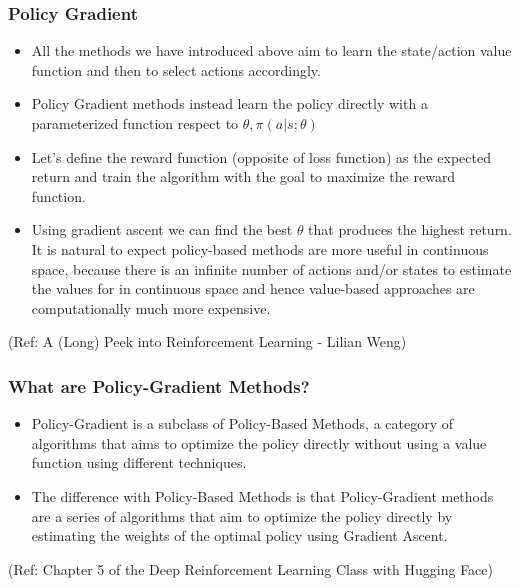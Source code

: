 \begin{frame}[fragile]\frametitle{Policy Gradient}

\begin{itemize}
\item All the methods we have introduced above aim to learn the state/action value function and then to
select actions accordingly. 
\item Policy Gradient methods instead learn the policy directly with a parameterized function respect to $\theta,\pi(a|s;\theta)$
\item Let's define the reward function (opposite of loss
function) as the expected return and train the algorithm with the goal to maximize the reward function.
\item Using gradient ascent we can find the best $\theta$ that produces the highest return. It is natural to expect
policy-based methods are more useful in continuous space, because there is an infinite number of
actions and/or states to estimate the values for in continuous space and hence value-based
approaches are computationally much more expensive.
\end{itemize}

{\tiny (Ref: A (Long) Peek into Reinforcement Learning - Lilian Weng)}


\end{frame}

\begin{frame}[fragile]\frametitle{What are Policy-Gradient Methods?}

\begin{itemize}
\item Policy-Gradient is a subclass of Policy-Based Methods, a category of algorithms that aims to optimize the policy directly without using a value function using different techniques. 
\item The difference with Policy-Based Methods is that Policy-Gradient methods are a series of algorithms that aim to optimize the policy directly by estimating the weights of the optimal policy using Gradient Ascent.
\end{itemize}

{\tiny (Ref: Chapter 5 of the Deep Reinforcement Learning Class with Hugging Face)}

\end{frame}

